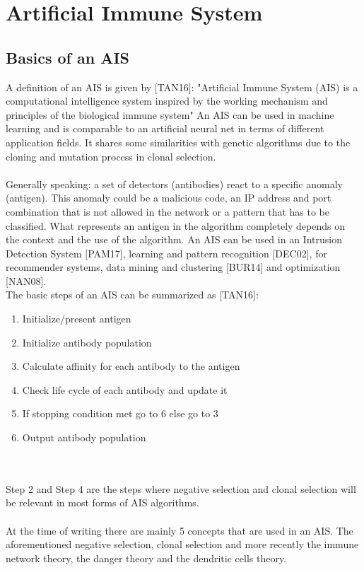 \chapter{Artificial Immune System}
\label{chap:ais}
\section{Basics of an AIS}
A definition of an AIS is given by [TAN16]:
"Artiﬁcial Immune System (AIS) is a computational intelligence system inspired by the working mechanism and principles of the biological immune system"
An AIS can be used in machine learning and is comparable to an artificial neural net in terms of different application fields.
It shares some similarities with genetic algorithms due to the cloning and mutation process in clonal selection.\\\\
Generally speaking: a set of detectors (antibodies) react to a specific anomaly (antigen). This anomaly could be a malicious code, an IP address and port combination that is not allowed in the network or a pattern that has to be classified. What represents an antigen in the algorithm completely depends on the context and the use of the algorithm. An AIS can be used in an Intrusion Detection System [PAM17], learning and pattern recognition [DEC02], for recommender systems, data mining and clustering [BUR14] and optimization [NAN08].\\

The basic steps of an AIS can be summarized as [TAN16]:
\begin{enumerate}
	\item 	Initialize/present antigen
	\item 	Initialize antibody population
	\item 	Calculate affinity for each antibody to the antigen
	\item 	Check life cycle of each antibody and update it
	\item 	If stopping condition met go to 6 else go to 3
	\item 	Output antibody population
\end{enumerate}\\\\Step 2 and Step 4 are the steps where negative selection and clonal selection will be relevant in most forms of AIS algorithms.\\\\
At the time of writing there are mainly 5 concepts that are used in an AIS. The aforementioned negative selection, clonal selection and more recently the immune network theory, the danger theory and the dendritic cells theory. 

